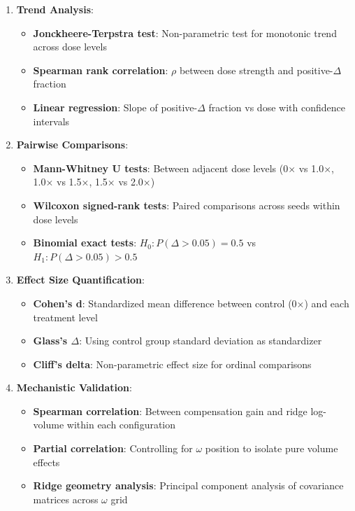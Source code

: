 \documentclass[conference]{IEEEtran}
\begin{document}
\begin{enumerate}
\item \textbf{Trend Analysis}:
  \begin{itemize}
  \item \textbf{Jonckheere-Terpstra test}: Non-parametric test for monotonic trend across dose levels
  \item \textbf{Spearman rank correlation}: $\rho$ between dose strength and positive-$\Delta$ fraction
  \item \textbf{Linear regression}: Slope of positive-$\Delta$ fraction vs dose with confidence intervals
  \end{itemize}

\item \textbf{Pairwise Comparisons}:
  \begin{itemize}
  \item \textbf{Mann-Whitney U tests}: Between adjacent dose levels (0× vs 1.0×, 1.0× vs 1.5×, 1.5× vs 2.0×)
  \item \textbf{Wilcoxon signed-rank tests}: Paired comparisons across seeds within dose levels
  \item \textbf{Binomial exact tests}: $H_0: P(\Delta > 0.05) = 0.5$ vs $H_1: P(\Delta > 0.05) > 0.5$
  \end{itemize}

\item \textbf{Effect Size Quantification}:
  \begin{itemize}
  \item \textbf{Cohen's d}: Standardized mean difference between control (0×) and each treatment level
  \item \textbf{Glass's $\Delta$}: Using control group standard deviation as standardizer
  \item \textbf{Cliff's delta}: Non-parametric effect size for ordinal comparisons
  \end{itemize}

\item \textbf{Mechanistic Validation}:
  \begin{itemize}
  \item \textbf{Spearman correlation}: Between compensation gain and ridge log-volume within each configuration
  \item \textbf{Partial correlation}: Controlling for $\omega$ position to isolate pure volume effects
  \item \textbf{Ridge geometry analysis}: Principal component analysis of covariance matrices across $\omega$ grid
  \end{itemize}
\end{enumerate}
\end{document}
